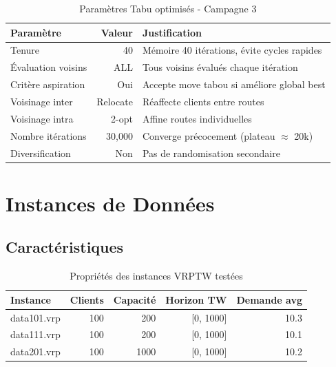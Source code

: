 \documentclass[12pt,a4paper,twoside]{report}
\begin{document}
\begin{table}[H]
    \centering
    \caption{Paramètres Tabu optimisés - Campagne 3}
    \begin{tabular}{|l|r|l|}
        \hline
        \textbf{Paramètre} & \textbf{Valeur} & \textbf{Justification}                       \\
        \hline
        Tenure             & 40              & Mémoire 40 itérations, évite cycles rapides  \\
        Évaluation voisins & ALL             & Tous voisins évalués chaque itération        \\
        Critère aspiration & Oui             & Accepte move tabou si améliore global best   \\
        Voisinage inter    & Relocate        & Réaffecte clients entre routes               \\
        Voisinage intra    & 2-opt           & Affine routes individuelles                  \\
        Nombre itérations  & 30,000          & Converge précocement (plateau $\approx$ 20k) \\
        Diversification    & Non             & Pas de randomisation secondaire              \\
        \hline
    \end{tabular}
\end{table}

\section{Instances de Données}

\subsection{Caractéristiques}

\begin{table}[H]
    \centering
    \caption{Propriétés des instances VRPTW testées}
    \begin{tabular}{|l|r|r|r|r|}
        \hline
        \textbf{Instance} & \textbf{Clients} & \textbf{Capacité} & \textbf{Horizon TW} & \textbf{Demande avg} \\
        \hline
        data101.vrp       & 100              & 200               & [0, 1000]           & 10.3                 \\
        data111.vrp       & 100              & 200               & [0, 1000]           & 10.1                 \\
        data201.vrp       & 100              & 1000              & [0, 1000]           & 10.2                 \\
        \hline
    \end{tabular}
\end{table}
\end{document}
